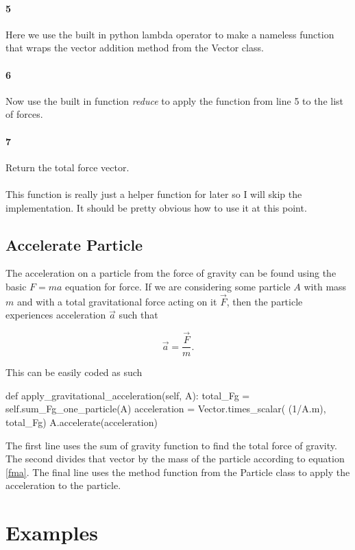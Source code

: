 \documentclass[15pt]{report}
\begin{document}
\paragraph{5} Here we use the built in python lambda operator to make a nameless function that wraps the vector addition method from the Vector class.
\paragraph{6} Now use the built in function \textit{reduce} to apply the function from line 5 to the list of forces.
\paragraph{7} Return the total force vector.
\paragraph{} This function is really just a helper function for later so I will skip the implementation. 
It should be pretty obvious how to use it at this point.


\subsection{Accelerate Particle}
The acceleration on a particle from the force of gravity can be found using the basic $F = ma$ equation for force. 
If we are considering some particle $A$ with mass $m$ and with a total gravitational force acting on it $\vec{F}$, 
then the particle experiences acceleration $\vec{a}$ such that 

\begin{equation} \label{fma}
\vec{a} = \frac{\vec{F}}{m}.
\end{equation}

This can be easily coded as such

\begin{code}
	def apply_gravitational_acceleration(self, A):
		total_Fg = self.sum_Fg_one_particle(A) 
		acceleration = Vector.times_scalar( (1/A.m), total_Fg)
		A.accelerate(acceleration) 
\end{code}
The first line uses the sum of gravity function to find the total force of gravity. The second divides that vector by the mass of the particle 
according to equation \ref{fma}. The final line uses the method function from the Particle class to apply the acceleration to the particle.
\section{Examples}
\end{document}

